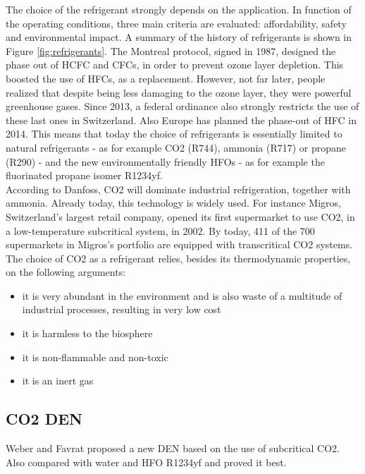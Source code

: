 \documentclass{article}
\begin{document}
The choice of the refrigerant strongly depends on the application. In function of the operating conditions, three main criteria are evaluated: affordability, safety and environmental impact.
A summary of the history of refrigerants is shown in Figure \ref{fig:refrigerants}.
The Montreal protocol, signed in 1987, designed the phase out of HCFC and CFCs, in order to prevent ozone layer depletion. This boosted the use of HFCs, as a replacement. However, not far later, people realized that despite being less damaging to the ozone layer, they were powerful greenhouse gases. Since 2013, a federal ordinance also strongly restricts the use of these last ones in Switzerland\cite{hydrocarbons21.comSwitzerlandIntroduceHFC}. Also Europe has planned the phase-out of HFC in 2014\cite{europeancommissionforclimateactionEULegislationControl2016}. This means that today the choice of refrigerants is essentially limited to natural refrigerants - as for example CO2 (R744), ammonia (R717) or propane (R290) - and the new environmentally friendly HFOs - as for example the fluorinated propane isomer R1234yf.\\
According to Danfoss\cite{danfossRefrigerantOptionsNow2017}, CO2 will dominate industrial refrigeration, together with ammonia. Already today, this technology is widely used. For instance Migros, Switzerland's largest retail company, opened its first supermarket to use CO2, in a low-temperature subcritical system, in 2002. By today, 411 of the 700 supermarkets in Migros’s portfolio are equipped with transcritical CO2 systems\cite{williamsMigrosDNA2018}.
The choice of CO2 as a refrigerant relies, besides its thermodynamic properties, on the following arguments\cite{cavalliniPROPERTIESCO2REFRIGERANT}:
\begin{itemize}
	\item it is very abundant in the environment and is also waste of a multitude of industrial processes, resulting in very low cost
	\item it is harmless to the biosphere
	\item it is non-flammable and non-toxic
	\item it is an inert gas
\end{itemize}

\subsection{CO2 DEN}
Weber and Favrat \cite{weberConventionalAdvancedCO22010a} proposed a new DEN based on the use of subcritical CO2. 
Also compared with water and HFO R1234yf and proved it best\cite{henchozPotentialRefrigerantBased}.
\end{document}
